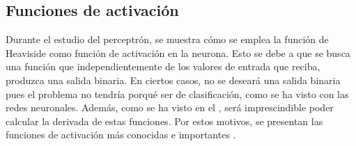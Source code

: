 		\subsection{Funciones de activación}
		
			Durante el estudio del perceptrón, se muestra cómo se emplea la función de Heaviside como función de activación en la neurona. Esto se debe a que se busca una función que independientemente de los valores de entrada que reciba, produzca una salida binaria. En ciertos casos, no se deseará una salida binaria pues el problema no tendría porqué ser de clasificación, como se ha visto con las redes neuronales. Además, como se ha visto en el , será imprescindible poder calcular la derivada de estas funciones. Por estos motivos, se presentan las funciones de activación más conocidas e importantes \cite{funcionesActivacion,softmax}. 
			
